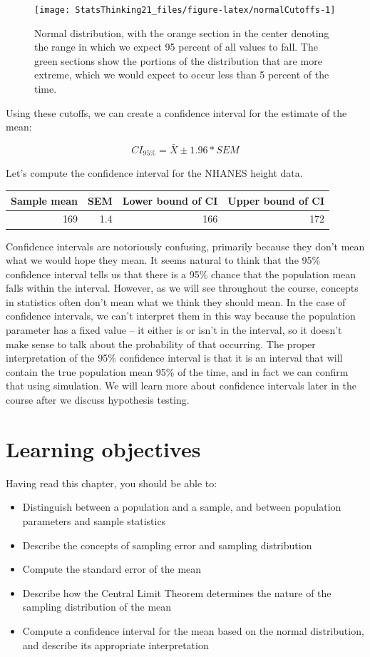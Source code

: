 \documentclass[12pt,]{book}
\providecommand{\tightlist}{%
  \setlength{\itemsep}{0pt}\setlength{\parskip}{0pt}}
\theoremstyle{definition}
\theoremstyle{definition}
\theoremstyle{definition}
\theoremstyle{remark}
\begin{document}
\begin{figure}
\texttt{[image: StatsThinking21\_files/figure-latex/normalCutoffs-1]} \caption{Normal distribution, with the orange section in the center denoting the range in which we expect 95 percent of all values to fall.  The green sections show the portions of the distribution that are more extreme, which we would expect to occur less than 5 percent of the time.}\label{fig:normalCutoffs}
\end{figure}

Using these cutoffs, we can create a confidence interval for the estimate of the mean:

\[
CI_{95\%} = \bar{X} \pm 1.96*SEM
\]

Let's compute the confidence interval for the NHANES height data.

\begin{tabular}{r|r|r|r}
\hline
Sample mean & SEM & Lower bound of CI & Upper bound of CI\\
\hline
169 & 1.4 & 166 & 172\\
\hline
\end{tabular}

Confidence intervals are notoriously confusing, primarily because they don't mean what we would hope they mean. It seems natural to think that the 95\% confidence interval tells us that there is a 95\% chance that the population mean falls within the interval. However, as we will see throughout the course, concepts in statistics often don't mean what we think they should mean. In the case of confidence intervals, we can't interpret them in this way because the population parameter has a fixed value -- it either is or isn't in the interval, so it doesn't make sense to talk about the probability of that occurring. The proper interpretation of the 95\% confidence interval is that it is an interval that will contain the true population mean 95\% of the time, and in fact we can confirm that using simulation. We will learn more about confidence intervals later in the course after we discuss hypothesis testing.

\hypertarget{learning-objectives-6}{%
\section{Learning objectives}\label{learning-objectives-6}}

Having read this chapter, you should be able to:

\begin{itemize}
\tightlist
\item
  Distinguish between a population and a sample, and between population parameters and sample statistics
\item
  Describe the concepts of sampling error and sampling distribution
\item
  Compute the standard error of the mean
\item
  Describe how the Central Limit Theorem determines the nature of the sampling distribution of the mean
\item
  Compute a confidence interval for the mean based on the normal distribution, and describe its appropriate interpretation
\end{itemize}
\end{document}
